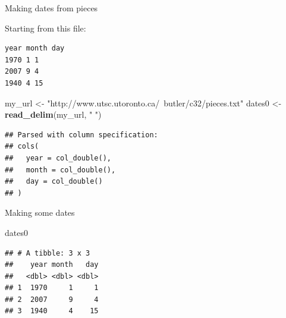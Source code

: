 \documentclass[
  ignorenonframetext,
]{beamer}
\newenvironment{Shaded}{\begin{snugshade}}{\end{snugshade}}
\newcommand{\DataTypeTok}[1]{\textcolor[rgb]{0.13,0.29,0.53}{#1}}
\newcommand{\KeywordTok}[1]{\textcolor[rgb]{0.13,0.29,0.53}{\textbf{#1}}}
\newcommand{\NormalTok}[1]{#1}
\newcommand{\OperatorTok}[1]{\textcolor[rgb]{0.81,0.36,0.00}{\textbf{#1}}}
\newcommand{\StringTok}[1]{\textcolor[rgb]{0.31,0.60,0.02}{#1}}
\begin{document}
\begin{frame}[fragile]{Making dates from pieces}
\protect\hypertarget{making-dates-from-pieces}{}

Starting from this file:

\begin{verbatim}
year month day
1970 1 1
2007 9 4
1940 4 15
\end{verbatim}

\begin{Shaded}
\begin{Highlighting}[]
\NormalTok{my_url <-}\StringTok{ "http://www.utsc.utoronto.ca/~butler/c32/pieces.txt"}
\NormalTok{dates0 <-}\StringTok{ }\KeywordTok{read_delim}\NormalTok{(my_url, }\StringTok{" "}\NormalTok{)}
\end{Highlighting}
\end{Shaded}

\begin{verbatim}
## Parsed with column specification:
## cols(
##   year = col_double(),
##   month = col_double(),
##   day = col_double()
## )
\end{verbatim}

\end{frame}

\begin{frame}[fragile]{Making some dates}
\protect\hypertarget{making-some-dates}{}

\begin{Shaded}
\begin{Highlighting}[]
\NormalTok{dates0}
\end{Highlighting}
\end{Shaded}

\begin{verbatim}
## # A tibble: 3 x 3
##    year month   day
##   <dbl> <dbl> <dbl>
## 1  1970     1     1
## 2  2007     9     4
## 3  1940     4    15
\end{verbatim}

\begin{Shaded}
\end{Shaded}

\end{frame}
\end{document}
